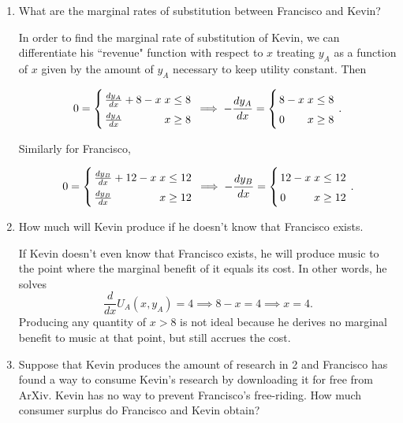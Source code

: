 \documentclass[11pt]{article}
\begin{document}
\begin{enumerate}

\item What are the marginal rates of substitution between Francisco and Kevin?

\begin{sol}
In order to find the marginal rate of substitution of Kevin, we can differentiate
his ``revenue" function with respect to $x$ treating $y_A$ as a function of $x$
given by the amount of $y_A$ necessary to keep utility constant. Then

$$\arraycolsep=1.4pt\def\arraystretch{1.5} 0 = \left\{ \begin{array}{ll} \frac{dy_A}{dx} + 8 - x & x \le 8 \\ \frac{dy_A}{dx} & x \ge 8 \end{array} \right. \implies -\frac{dy_A}{dx} = \left \{ \begin{array}{ll} 8-x & x \le 8 \\ 0 & x \ge 8 \end{array} \right..$$

Similarly for Francisco,

$$\arraycolsep=1.4pt\def\arraystretch{1.5} 0 = \left\{ \begin{array}{ll} \frac{dy_B}{dx} + 12 - x & x \le 12 \\ \frac{dy_B}{dx} & x \ge 12 \end{array} \right. \implies -\dfrac{dy_B}{dx} = \left\{ \begin{array}{ll} 12 - x & x \le 12 \\ 0 & x \ge 12 \end{array} \right..$$

\end{sol}

\item How much will Kevin produce if he doesn't know that Francisco exists.

\begin{sol}
If Kevin doesn't even know that Francisco exists, he will produce music to the
point where the marginal benefit of it equals its cost. In other words, he
solves
$$\dfrac{d}{dx} U_A(x,y_A) = 4 \implies 8 - x = 4 \implies \boxed{x=4}.$$
Producing any quantity of $x > 8$ is not ideal because he derives no marginal
benefit to music at that point, but still accrues the cost.
\end{sol}

\item Suppose that Kevin produces the amount of research in 2 and Francisco has
found a way to consume Kevin's research by downloading it for free from ArXiv.
Kevin has no way to prevent Francisco's free-riding. How much consumer surplus
do Francisco and Kevin obtain?


\end{enumerate}
\end{document}
